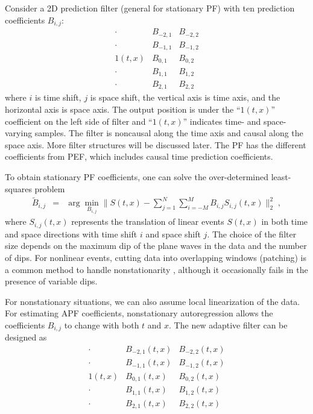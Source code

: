 Consider a 2D prediction filter (general for stationary PF) with
ten prediction coefficients $B_{i,j}$:
\begin{equation}
   \begin{array}{ccc}
      \cdot         &B_{-2,1}  &B_{-2,2} \\
      \cdot         &B_{-1,1}  &B_{-1,2} \\
      1(t,x)        &B_{0,1}   &B_{0,2}  \\
      \cdot         &B_{1,1}   &B_{1,2}  \\
      \cdot         &B_{2,1}   &B_{2,2}  
  \end{array}
\label{eqn:noilace}
\end{equation}
where $i$ is time shift, $j$ is space shift, the vertical axis is time
axis, and the horizontal axis is space axis. The output position is
under the ``$1(t,x)$'' coefficient on the left side of filter and
``$1(t,x)$'' indicates time- and space-varying samples. The filter is
noncausal along the time axis and causal along the space axis. More
filter structures will be discussed later. The PF has the different
coefficients from PEF, which includes causal time prediction
coefficients.

To obtain stationary PF coefficients, one can solve the
over-determined least-squares problem 
{\setlength\arraycolsep{2pt}
\begin{eqnarray}
  \label{eq:pred1}
\tilde{B}_{i,j} &=& \arg\min_{B_{i,j}}\|S(t,x)-
              \sum_{j=1}^{N}\sum_{i=-M}^{M} B_{i,j}S_{i,j}(t,x)\|_2^2 \;,
\end{eqnarray}}
where $S_{i,j}(t,x)$ represents the translation of linear events
$S(t,x)$ in both time and space directions with time shift $i$ and
space shift $j$. The choice of the filter size depends on the maximum
dip of the plane waves in the data and the number of dips. For
nonlinear events, cutting data into overlapping windows (patching) is
a common method to handle nonstationarity
\cite[]{Claerbout10}, although it occasionally fails in the presence
of variable dips.

For nonstationary situations, we can also assume local linearization
of the data. For estimating APF coefficients, nonstationary
autoregression allows the coefficients $B_{i,j}$ to change with both
$t$ and $x$. The new adaptive filter can be designed as
\begin{equation}
   \begin{array}{ccc} 
      \cdot   &B_{-2,1}(t,x)  &B_{-2,2}(t,x) \\
      \cdot   &B_{-1,1}(t,x)  &B_{-1,2}(t,x) \\
      1(t,x)  &B_{0,1}(t,x)   &B_{0,2}(t,x)  \\
      \cdot   &B_{1,1}(t,x)   &B_{1,2}(t,x)  \\
      \cdot   &B_{2,1}(t,x)   &B_{2,2}(t,x) 
   \end{array}
\label{eqn:ailacefil}
\end{equation}

